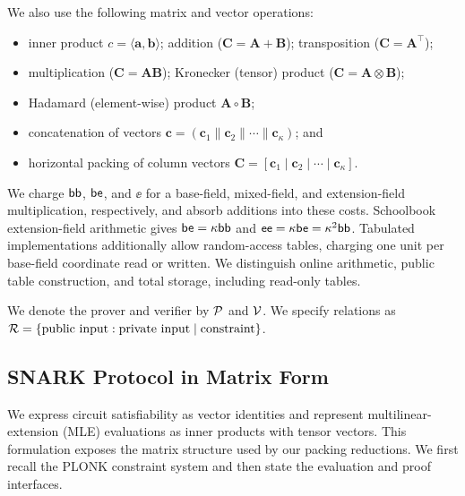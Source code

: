 We also use the following matrix and vector operations:
\begin{itemize}[noitemsep, topsep = 0pt]
\item inner product $c = \langle \bm a, \bm b \rangle$; addition ($\bm C = \bm A + \bm B$); transposition ($\bm C = \bm A^\top$);
\item multiplication
($\bm C = \bm A\bm B$); Kronecker (tensor) product ($\bm C = \bm A \otimes \bm B$);
\item Hadamard (element-wise) product $\bm{A} \circ \bm{B}$;
\item concatenation of vectors $\bm{c} = (\bm c_1 \| \bm c_2 \|\cdots \| \bm c_\kappa)$; and
\item horizontal packing of column vectors $\bm C = [\bm c_1 \mid \bm c_2 \mid \cdots \mid \bm c_\kappa]$.
\end{itemize}
    
We charge \(\mathsf{bb}\), \(\mathsf{be}\), and \(\ee\) for a base-field,
mixed-field, and extension-field multiplication, respectively,
and absorb additions into these costs. Schoolbook extension-field
arithmetic gives
\(
    \mathsf{be}=\kappa\mathsf{bb}
\) and
\(
    \mathsf{ee}=\kappa\mathsf{be}=\kappa^2\mathsf{bb}
\).
Tabulated implementations additionally allow random-access tables,
charging one unit per base-field coordinate read or written.
We distinguish online arithmetic, public table construction,
and total storage, including read-only tables.


We denote the prover and verifier by $\mathcal{P}$ and $\mathcal{V}$.
We specify relations as
$\mathcal{R}=\{\text{public input}:\text{private input}\mid\text{constraint}\}$.

\subsection{SNARK Protocol in Matrix Form}
\label{sec:defgeneral}
We express circuit satisfiability as vector identities and represent
multilinear-extension (MLE) evaluations as inner products with
tensor vectors. This formulation exposes the matrix structure used
by our packing reductions. We first recall the PLONK constraint
system and then state the evaluation and proof interfaces.


